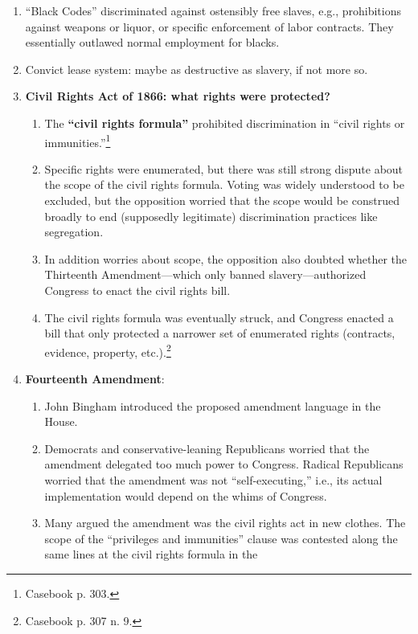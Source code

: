 \begin{enumerate}
    \item ``Black Codes'' discriminated against ostensibly free slaves, e.g., 
    prohibitions against weapons or liquor, or specific enforcement of labor 
    contracts. They essentially outlawed normal employment for blacks.
    \item Convict lease system: maybe as destructive as slavery, if not 
    more so.
    \item \textbf{Civil Rights Act of 1866: what rights were protected?}
    \begin{enumerate}
        \item The \textbf{``civil rights formula''} prohibited discrimination 
        in ``civil rights or immunities.''\footnote{Casebook p. 303.}
        \item Specific rights were enumerated, but there was still strong 
        dispute about the scope of the civil rights formula. Voting was widely 
        understood to be excluded, but the opposition worried that the scope 
        would be construed broadly to end (supposedly legitimate) 
        discrimination practices like segregation.
        \item In addition worries about scope, the opposition also doubted 
        whether the Thirteenth Amendment---which only banned 
        slavery---authorized Congress to enact the civil rights bill.
        \item The civil rights formula was eventually struck, and Congress 
        enacted a bill that only protected a narrower set of enumerated rights 
        (contracts, evidence, property, etc.).\footnote{Casebook p. 307 n. 9.}
    \end{enumerate}
    \item \textbf{Fourteenth Amendment}:
    \begin{enumerate}
        \item John Bingham introduced the proposed amendment language in the 
        House.
        \item Democrats and conservative-leaning Republicans worried that the 
        amendment delegated too much power to Congress. Radical Republicans 
        worried that the amendment was not ``self-executing,'' i.e., its 
        actual implementation would depend on the whims of Congress.
        \item Many argued the amendment was the civil rights act in new 
        clothes. The scope of the ``privileges and immunities'' clause was 
        contested along the same lines at the civil rights formula in the 

\end{enumerate}
\end{enumerate}
